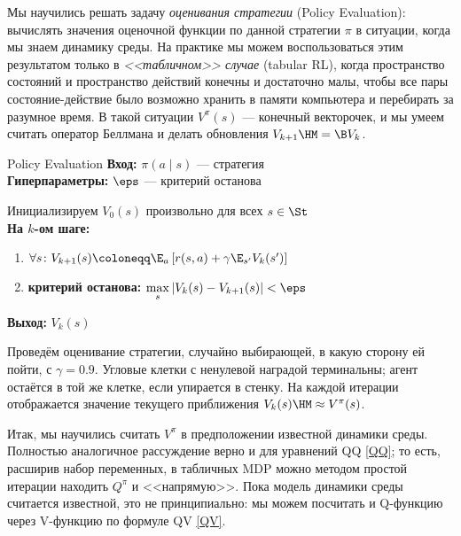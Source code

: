 Мы научились решать задачу \emph{оценивания стратегии} (Policy Evaluation): вычислять значения оценочной функции по данной стратегии $\pi$ в ситуации, когда мы знаем динамику среды. На практике мы можем воспользоваться этим результатом только в \emph{<<табличном>> случае} (tabular RL), когда пространство состояний и пространство действий конечны и достаточно малы, чтобы все пары состояние-действие было возможно хранить в памяти компьютера и перебирать за разумное время. В такой ситуации $V^\pi(s)$ --- конечный векторочек, и мы умеем считать оператор Беллмана и делать обновления $V_{k+1} \HM= \B V_k$.

\begin{algorithm}[label=policyevaluation]{Policy Evaluation}
\textbf{Вход:} $\pi(a \mid s)$ --- стратегия \\
\textbf{Гиперпараметры:} $\eps$ --- критерий останова

\vspace{0.3cm}
Инициализируем $V_0(s)$ произвольно для всех $s \in \St$ \\
\textbf{На $k$-ом шаге:}
\begin{enumerate}
    \item $\forall s \colon V_{k+1}(s) \coloneqq \E_{a} \left[ r(s, a) + \gamma \E_{s'} V_k(s')\right]$
    \item \textbf{критерий останова:} $\max\limits_s |V_k(s) - V_{k+1}(s)| < \eps$
\end{enumerate}

\vspace{0.3cm}
\textbf{Выход:} $V_k(s)$
\end{algorithm}

\begin{exampleBox}[label=ex:pe, righthand ratio=0.25, sidebyside, sidebyside align=center, lower separated=false]{}
Проведём оценивание стратегии, случайно выбирающей, в какую сторону ей пойти, с $\gamma = 0.9$. Угловые клетки с ненулевой наградой терминальны; агент остаётся в той же клетке, если упирается в стенку. На каждой итерации отображается значение текущего приближения $V_k(s) \HM\approx V^{\pi}(s)$.

\tcblower
\end{exampleBox}

Итак, мы научились считать $V^\pi$ в предположении известной динамики среды. Полностью аналогичное рассуждение верно и для уравнений QQ \eqref{QQ}; то есть, расширив набор переменных, в табличных MDP можно методом простой итерации находить $Q^{\pi}$ и <<напрямую>>. Пока модель динамики среды считается известной, это не принципиально: мы можем посчитать и Q-функцию через V-функцию по формуле QV \eqref{QV}.


